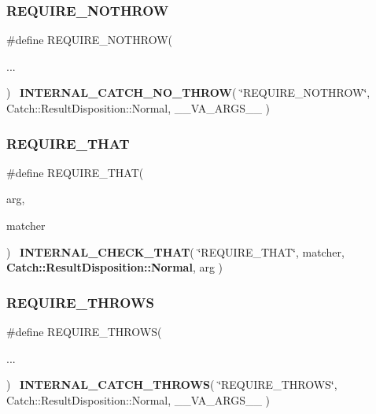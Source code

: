 \mbox{\label{catch_8hpp_ab0148f0dfca438f7aa01974e9c33216a}} 
\subsubsection{REQUIRE\_NOTHROW}
{\footnotesize\ttfamily \#define R\+E\+Q\+U\+I\+R\+E\+\_\+\+N\+O\+T\+H\+R\+OW(\begin{DoxyParamCaption}\item[{}]{... }\end{DoxyParamCaption})~\textbf{ I\+N\+T\+E\+R\+N\+A\+L\+\_\+\+C\+A\+T\+C\+H\+\_\+\+N\+O\+\_\+\+T\+H\+R\+OW}( \char`\"{}R\+E\+Q\+U\+I\+R\+E\+\_\+\+N\+O\+T\+H\+R\+OW\char`\"{}, Catch\+::\+Result\+Disposition\+::\+Normal, \+\_\+\+\_\+\+V\+A\+\_\+\+A\+R\+G\+S\+\_\+\+\_\+ )}

\mbox{\label{catch_8hpp_ac1354db6f3e9c1e0a8eda0eea7ff1f0a}} 
\subsubsection{REQUIRE\_THAT}
{\footnotesize\ttfamily \#define R\+E\+Q\+U\+I\+R\+E\+\_\+\+T\+H\+AT(\begin{DoxyParamCaption}\item[{}]{arg,  }\item[{}]{matcher }\end{DoxyParamCaption})~\textbf{ I\+N\+T\+E\+R\+N\+A\+L\+\_\+\+C\+H\+E\+C\+K\+\_\+\+T\+H\+AT}( \char`\"{}R\+E\+Q\+U\+I\+R\+E\+\_\+\+T\+H\+AT\char`\"{}, matcher, \textbf{ Catch\+::\+Result\+Disposition\+::\+Normal}, arg )}

\mbox{\label{catch_8hpp_ae3c33faa1d31a2bb0811dac74b994e3e}} 
\subsubsection{REQUIRE\_THROWS}
{\footnotesize\ttfamily \#define R\+E\+Q\+U\+I\+R\+E\+\_\+\+T\+H\+R\+O\+WS(\begin{DoxyParamCaption}\item[{}]{... }\end{DoxyParamCaption})~\textbf{ I\+N\+T\+E\+R\+N\+A\+L\+\_\+\+C\+A\+T\+C\+H\+\_\+\+T\+H\+R\+O\+WS}( \char`\"{}R\+E\+Q\+U\+I\+R\+E\+\_\+\+T\+H\+R\+O\+WS\char`\"{}, Catch\+::\+Result\+Disposition\+::\+Normal, \+\_\+\+\_\+\+V\+A\+\_\+\+A\+R\+G\+S\+\_\+\+\_\+ )}

